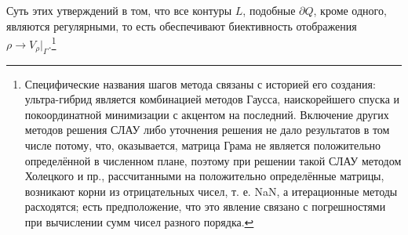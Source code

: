 \documentclass[a4paper, 12pt]{article}
\begin{document}
Суть этих утверждений в том, что все контуры $L$, подобные $\partial Q$, кроме одного, являются регулярными, то есть обеспечивают биективность отображения $\rho \rightarrow V_{\rho}|_{\Gamma}$.\footnote{ Специфические названия шагов метода связаны с историей его создания: ультра-гибрид является комбинацией методов Гаусса, наискорейшего спуска и покоординатной минимизации с акцентом на последний. Включение других методов решения СЛАУ либо уточнения решения не дало результатов в том числе потому, что, оказывается, матрица Грама не является положительно определённой в численном плане, поэтому при решении такой СЛАУ методом Холецкого и пр., рассчитанными на положительно определённые матрицы, возникают корни из отрицательных чисел, т. е. NaN, а итерационные методы расходятся; есть предположение, что это явление связано с погрешностями при вычислении сумм чисел разного порядка.}
\end{document}
